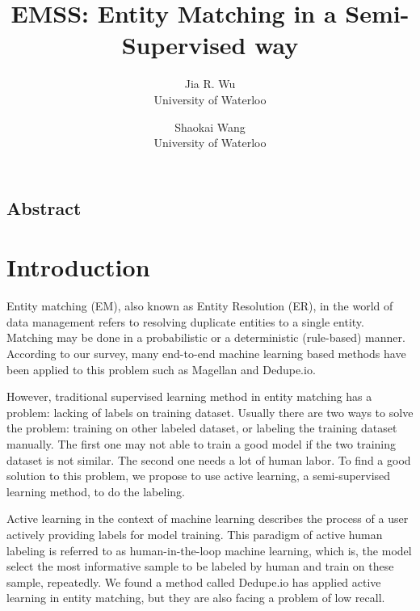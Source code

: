 \documentclass[letterpaper,twocolumn,10pt]{article}
\begin{document}
\date{}

\title{\Large \bf EMSS: Entity Matching in a Semi-Supervised way}




\author{
{\rm Jia R. Wu}\\
University of Waterloo
\and
{\rm Shaokai Wang}\\
University of Waterloo
} %

\maketitle

\thispagestyle{empty}


\subsection*{Abstract}



\section{Introduction}
Entity matching (EM), also known as Entity Resolution (ER), in the world of data management refers to resolving duplicate entities to a single entity. Matching may be done in a probabilistic or a deterministic (rule-based) manner. According to our survey, many end-to-end machine learning based methods have been applied to this problem such as Magellan and Dedupe.io.

However, traditional supervised learning method in entity matching has a problem: lacking of labels on training dataset. Usually there are two ways to solve the problem: training on other labeled dataset, or labeling the training dataset manually. The first one may not able to train a good model if the two training dataset is not similar. The second one needs a lot of human labor. To find a good solution to this problem, we propose to use active learning, a semi-supervised learning method, to do the labeling.

Active learning in the context of machine learning describes the process of a user actively providing labels for model training. This paradigm of active human labeling is referred to as human-in-the-loop machine learning, which is, the model select the most informative sample to be labeled by human and train on these sample, repeatedly. We found a method called Dedupe.io has applied active learning in entity matching, but they are also facing a problem of low recall.
\end{document}
